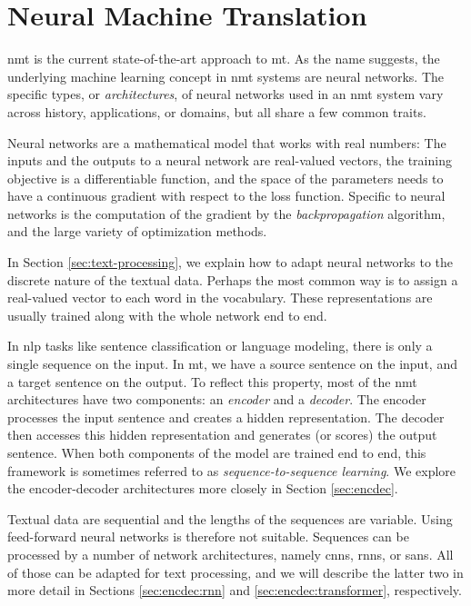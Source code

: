 \chapter{Neural Machine Translation}
\label{chap:nmt}

\Ac{nmt} is the current state-of-the-art approach to \ac{mt}. As the name
suggests, the underlying machine learning concept in \ac{nmt} systems are
neural networks. The specific types, or \emph{architectures}, of neural
networks used in an \ac{nmt} system vary across history, applications, or
domains, but all share a few common traits.

Neural networks are a mathematical model that works with real numbers: The
inputs and the outputs to a neural network are real-valued vectors, the
training objective is a differentiable function, and the space of the
parameters needs to have a continuous gradient with respect to the loss
function. Specific to neural networks is the computation of the gradient by the
\emph{backpropagation} algorithm, and the large variety of optimization
methods.

In Section \ref{sec:text-processing}, we explain how to adapt neural networks
to the discrete nature of the textual data. Perhaps the most common way is to
assign a real-valued vector to each word in the vocabulary. These
representations are usually trained along with the whole network end to end.

In \acs{nlp} tasks like sentence classification or language modeling, there is
only a single sequence on the input. In \ac{mt}, we have a source sentence on
the input, and a target sentence on the output. To reflect this property, most
of the \ac{nmt} architectures have two components: an \emph{encoder} and a
\emph{decoder}. The encoder processes the input sentence and creates a hidden
representation. The decoder then accesses this hidden representation and
generates (or scores) the output sentence. When both components of the model
are trained end to end, this framework is sometimes referred to as
\emph{sequence-to-sequence learning}. We explore the encoder-decoder
architectures more closely in Section \ref{sec:encdec}.

Textual data are sequential and the lengths of the sequences are
variable. Using feed-forward neural networks is therefore not
suitable. Sequences can be processed by a number of network architectures,
namely \acp{cnn}, \acp{rnn}, or \acp{san}. All of those can be adapted for text
processing, and we will describe the latter two in more detail in Sections
\ref{sec:encdec:rnn} and \ref{sec:encdec:transformer}, respectively.


